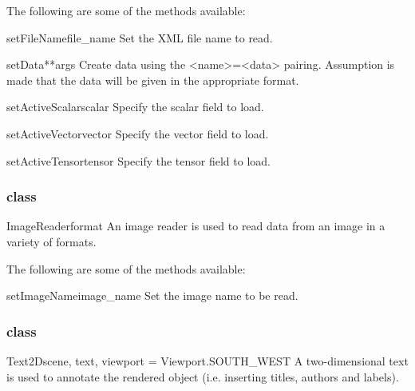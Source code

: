 The following are some of the methods available:
\begin{methoddesc}[DataCollector]{setFileName}{file_name}
Set the XML file name to read.
\end{methoddesc}

\begin{methoddesc}[DataCollector]{setData}{**args}
Create data using the \textless name\textgreater=\textless data\textgreater 
pairing. Assumption is made that the data will be given in the 
appropriate format.
\end{methoddesc}

\begin{methoddesc}[DataCollector]{setActiveScalar}{scalar}
Specify the scalar field to load.
\end{methoddesc}

\begin{methoddesc}[DataCollector]{setActiveVector}{vector}
Specify the vector field to load.
\end{methoddesc}

\begin{methoddesc}[DataCollector]{setActiveTensor}{tensor}
Specify the tensor field to load.
\end{methoddesc}

\subsubsection{\ImageReader class}

\begin{classdesc}{ImageReader}{format}
An image reader is used to read data from an image in a variety of formats.
\end{classdesc}

The following are some of the methods available:
\begin{methoddesc}[ImageReader]{setImageName}{image_name}
Set the image name to be read.
\end{methoddesc}

\subsubsection{\TextTwoD class}

\begin{classdesc}{Text2D}{scene, text, viewport = Viewport.SOUTH_WEST}
A two-dimensional text is used to annotate the rendered object 
(i.e. inserting titles, authors and labels).
\end{classdesc}

